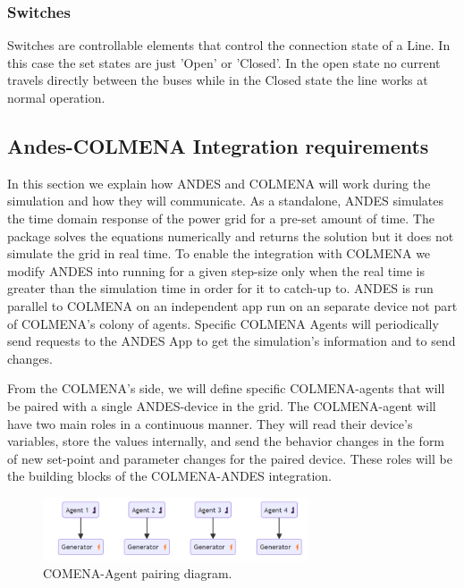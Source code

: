 \documentclass{article}
\begin{document}
\subsubsection*{Switches}
Switches are controllable elements that control the connection state of a Line. In this case the set states are just 'Open' or 'Closed'. In the open state no current travels directly between the buses while in the Closed state the line works at normal operation. 

\subsection{Andes-COLMENA Integration requirements}

In this section we explain how ANDES and COLMENA will work during the simulation and how they will communicate. As a standalone, ANDES simulates the time domain response of the power grid for a pre-set amount of time. The package solves the equations numerically and returns the solution but it does not simulate the grid in real time. To enable the integration with COLMENA we modify ANDES into running for a given step-size only when the real time is greater than the simulation time in order for it to catch-up to. ANDES is run parallel to COLMENA on an independent app run on an separate device not part of COLMENA's colony of agents. Specific COLMENA Agents will periodically send requests to the ANDES App to get the simulation's information and to send changes.   

From the COLMENA's side, we will define specific COLMENA-agents that will be paired with a single ANDES-device in the grid. The COLMENA-agent will have two main roles in a continuous manner. They will read their device's variables, store the values internally, and send the behavior changes in the form of new set-point and parameter changes for the paired device. These roles will be the building blocks of the COLMENA-ANDES integration.      


\begin{figure}[!htb]
    \centering
    \includegraphics[width=0.7\textwidth]{pictures/colmena_pairing.png}
    \caption{COMENA-Agent pairing diagram.}
    \label{fig:diagram_pairing}
\end{figure}
\end{document}
